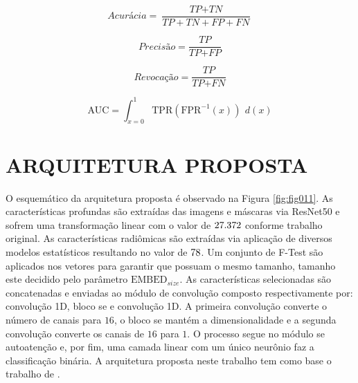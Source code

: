 \begin{equation}
  \textit{Acurácia} = \frac{\textit{TP} + \textit{TN}}{\textit{TP} + \textit{TN} + \textit{FP} + \textit{FN}}
  \label{eq:acc}
\end{equation}

\begin{equation}
  \textit{Precisão} = \frac{\textit{TP}}{\textit{TP} + \textit{FP}}
  \label{eq:precision}
\end{equation}

\begin{equation}
  \textit{Revocação} = \frac{\textit{TP}}{\textit{TP} + \textit{FN}}
  \label{eq:recall}
\end{equation}

\begin{equation}
  \text{AUC} = \int_{x=0}^{1} \text{TPR}(\text{FPR}^{-1}(x)) \ \, d(x)
  \label{eq:auc}
\end{equation}

\section{ARQUITETURA PROPOSTA}
\label{subsec:cap4_architecture}


O esquemático da arquitetura proposta é observado na Figura \ref{fig:fig011}. As características profundas são extraídas das imagens e máscaras via ResNet50 e sofrem uma transformação linear com o valor de $27.372$ conforme trabalho original. As características radiômicas são extraídas via aplicação de diversos modelos estatísticos resultando no valor de $78$. Um conjunto de F-Test são aplicados nos vetores para garantir que possuam o mesmo tamanho, tamanho este decidido pelo parâmetro $\text{EMBED}_{size}$. As características selecionadas são concatenadas e enviadas ao módulo de convolução composto respectivamente por: convolução 1D, bloco \gls{se} e convolução 1D. A primeira convolução converte o número de canais para $16$, o bloco \gls{se} mantém a dimensionalidade e a segunda convolução converte os canais de $16$ para $1$. O processo segue no módulo se autoatenção e, por fim, uma camada linear com um único neurônio faz a classificação binária. A arquitetura proposta neste trabalho tem como base o trabalho de \cite{aiSelfAttentionBasedFusion2023}.
\newline

